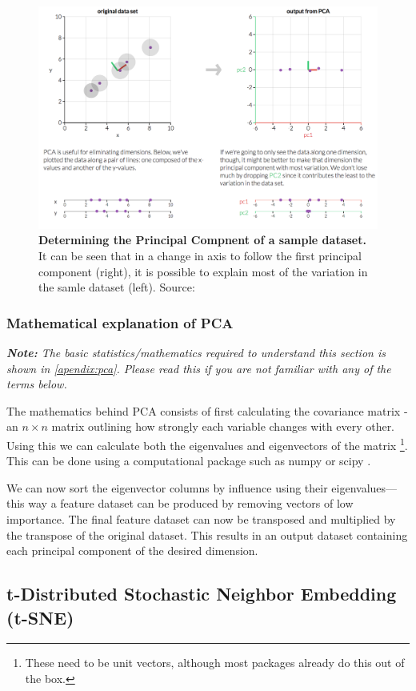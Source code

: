 \begin{figure}[H]
    \centering
    \includegraphics[width=.8\textwidth]{./4fig/pca2d.png}
    \caption{\textbf{Determining the Principal Compnent of a sample dataset.} It can be seen that in a change in axis to follow the first principal component (right), it is possible to explain most of the variation in the samle dataset (left). Source: \citep{pcaim}}
    \label{fig:2dpca}
\end{figure}


\subsubsection{Mathematical explanation of PCA}
\emph{\textbf{Note:} The basic statistics/mathematics required to understand this section is shown in \autoref{apendix:pca}. Please read this if you are not familiar with any of the terms below.
}

The mathematics behind PCA consists of first calculating the covariance matrix - an $n \times n$ matrix outlining how strongly each variable changes with every other. Using this we can calculate both the eigenvalues and eigenvectors of the matrix \footnote{These need to be unit vectors, although most packages already do this out of the box.}. This can be done using a computational package such as numpy or scipy \citep{numpy,scipy}.

We can now sort the eigenvector columns by influence using their eigenvalues—this way a feature dataset can be produced by removing vectors of low importance. The final feature dataset can now be transposed and multiplied by the transpose of the original dataset. This results in an output dataset containing each principal component of the desired dimension.



\subsection{t-Distributed Stochastic Neighbor Embedding (t-SNE)}\label{sec:overcrowd}


